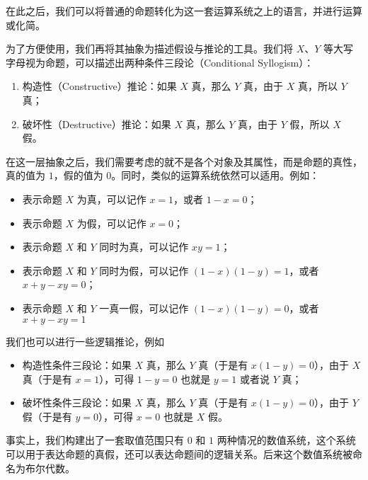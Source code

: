         在此之后，我们可以将普通的命题转化为这一套运算系统之上的语言，并进行运算或化简。

        为了方便使用，我们再将其抽象为描述假设与推论的工具。我们将 $X$、$Y$ 等大写字母视为命题，可以描述出两种条件三段论（Conditional Syllogism）：
        \begin{enumerate}
            \item 构造性（Constructive）推论：如果 $X$ 真，那么 $Y$ 真，由于 $X$ 真，所以 $Y$ 真；
            \item 破坏性（Destructive）推论：如果 $X$ 真，那么 $Y$ 真，由于 $Y$ 假，所以 $X$ 假。
        \end{enumerate}

        在这一层抽象之后，我们需要考虑的就不是各个对象及其属性，而是命题的真性，真的值为 $1$，假的值为 $0$。同时，类似的运算系统依然可以适用。例如：
        \begin{itemize}
            \item 表示命题 $X$ 为真，可以记作 $x = 1$，或者 $1 - x = 0$；
            \item 表示命题 $X$ 为假，可以记作 $x = 0$；
            \item 表示命题 $X$ 和 $Y$ 同时为真，可以记作 $xy = 1$；
            \item 表示命题 $X$ 和 $Y$ 同时为假，可以记作 $(1 - x)(1 - y) = 1$，或者 $x + y - xy = 0$；
            \item 表示命题 $X$ 和 $Y$ 一真一假，可以记作 $(1 - x)(1 - y) = 0$，或者 $x + y - xy = 1$
        \end{itemize}

        我们也可以进行一些逻辑推论，例如
        \begin{itemize}
            \item 构造性条件三段论：如果 $X$ 真，那么 $Y$ 真（于是有 $x(1 - y) = 0$），由于 $X$ 真（于是有 $x = 1$），可得 $1 - y = 0$ 也就是 $y = 1$ 或者说 $Y$ 真；
            \item 破坏性条件三段论：如果 $X$ 真，那么 $Y$ 真（于是有 $x(1 - y) = 0$），由于 $Y$ 假（于是有 $y = 0$），可得 $x = 0$ 也就是 $X$ 假。
        \end{itemize}

        事实上，我们构建出了一套取值范围只有 $0$ 和 $1$ 两种情况的数值系统，这个系统可以用于表达命题的真假，还可以表达命题间的逻辑关系。后来这个数值系统被命名为布尔代数。

